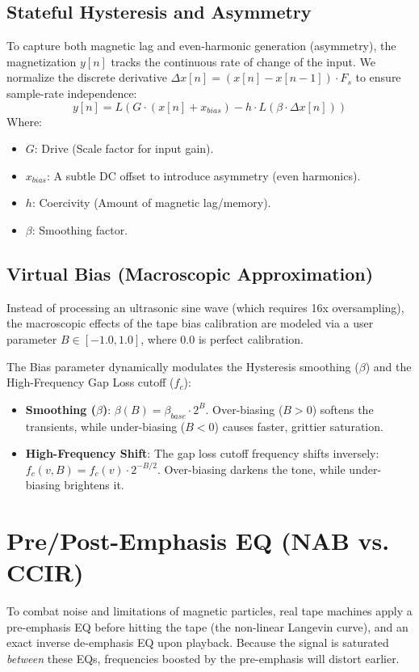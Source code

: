 \documentclass[a4paper, 11pt]{article}
\begin{document}
\subsection{Stateful Hysteresis and Asymmetry}
To capture both magnetic lag and even-harmonic generation (asymmetry), the magnetization $y[n]$ tracks the continuous rate of change of the input. We normalize the discrete derivative $\Delta x[n] = (x[n] - x[n-1]) \cdot F_s$ to ensure sample-rate independence:
\begin{equation}
    y[n] = L\left(G \cdot (x[n] + x_{bias}) - h \cdot L(\beta \cdot \Delta x[n])\right)
\end{equation}
Where:
\begin{itemize}
    \item $G$: Drive (Scale factor for input gain).
    \item $x_{bias}$: A subtle DC offset to introduce asymmetry (even harmonics).
    \item $h$: Coercivity (Amount of magnetic lag/memory).
    \item $\beta$: Smoothing factor.
\end{itemize}

\subsection{Virtual Bias (Macroscopic Approximation)}
Instead of processing an ultrasonic sine wave (which requires 16x oversampling), the macroscopic effects of the tape bias calibration are modeled via a user parameter $B \in [-1.0, 1.0]$, where $0.0$ is perfect calibration.

The Bias parameter dynamically modulates the Hysteresis smoothing ($\beta$) and the High-Frequency Gap Loss cutoff ($f_c$):
\begin{itemize}
    \item \textbf{Smoothing ($\beta$)}: $\beta(B) = \beta_{base} \cdot 2^B$. Over-biasing ($B > 0$) softens the transients, while under-biasing ($B < 0$) causes faster, grittier saturation.
    \item \textbf{High-Frequency Shift}: The gap loss cutoff frequency shifts inversely: $f_c(v, B) = f_c(v) \cdot 2^{-B/2}$. Over-biasing darkens the tone, while under-biasing brightens it.
\end{itemize}

\section{Pre/Post-Emphasis EQ (NAB vs. CCIR)}
To combat noise and limitations of magnetic particles, real tape machines apply a pre-emphasis EQ before hitting the tape (the non-linear Langevin curve), and an exact inverse de-emphasis EQ upon playback. Because the signal is saturated \textit{between} these EQs, frequencies boosted by the pre-emphasis will distort earlier.
\end{document}
